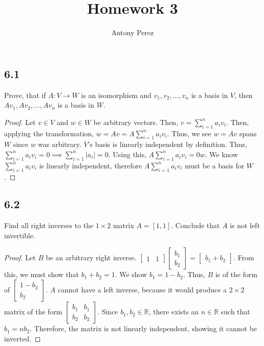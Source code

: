 \documentclass{amsart}
\title{Homework 3}
\author{Antony Perez}
\begin{document}
\maketitle
\subsection*{6.1} Prove, that if $A: V \rightarrow W$ is an isomorphism and $v_1,v_2,\ldots,v_n$ is a basis in $V$, then $Av_1,Av_2,\ldots,Av_n$ is a basis in $W$.
\begin{proof}
    Let $v \in V$ and $w \in W$ be arbitrary vectors. Then, $v = \sum_{i=1}^{n}a_iv_i$. Then, applying the transformation, $w = Av = A\sum_{i=1}^{n}a_iv_i$. Thus, we see $w = Av$ spans $W$ since $w$ was arbitrary.
    $V$'s basis is linearly independent by definition. Thus, $\sum_{i=1}^{n}a_iv_i = 0 \implies \sum_{i=1}^{n}|a_i| = 0$. Using this, $A\sum_{i=1}^{n}a_iv_i = 0w$. We know $\sum_{i=1}^{n}a_iv_i$ is linearly independent, therefore $A\sum_{i=1}^{n}a_iv_i$ must be a basis for $W$. 
\end{proof}
\subsection*{6.2} Find all right inverses to the $1 \times 2$ matrix $A= [1,1]$. Conclude that $A$ is not left invertible.
\begin{proof}
    Let $B$ be an arbitrary right inverse. $\begin{bmatrix}
        1 & 1
    \end{bmatrix} \begin{bmatrix}
        b_1 \\ b_2
    \end{bmatrix} = \begin{bmatrix}
        b_1 + b_2
    \end{bmatrix}$. From this, we must show that $b_1 + b_2 = 1$. We show $b_1 = 1 - b_2$. Thus, $B$ is of the form of $\begin{bmatrix}
        1-b_2 \\ b_2
    \end{bmatrix}$. $A$ cannot have a left inverse, because it would produce a $2\times 2$ matrix of the form $\begin{bmatrix}
        b_1 & b_1 \\ b_2 & b_2 
    \end{bmatrix}$. Since $b_1,b_2 \in \mathbb{R}$, there exists an $n \in \mathbb{R}$ such that $b_1 = nb_2$. Therefore, the matrix is not linearly independent, showing it cannot be inverted. 
\end{proof}
\end{document}
